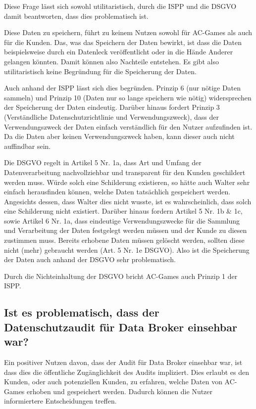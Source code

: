 Diese Frage lässt sich sowohl utilitaristisch, durch die ISPP und die DSGVO damit beantworten, dass dies problematisch ist.

Diese Daten zu speichern, führt zu keinem Nutzen sowohl für AC-Games als auch für die Kunden.
Das, was das Speichern der Daten bewirkt, ist dass die Daten beispielsweise durch ein Datenleck veröffentlicht oder in die Hände Anderer gelangen könnten.
Damit können also Nachteile entstehen.
Es gibt also utilitaristisch keine Begründung für die Speicherung der Daten.

Auch anhand der ISPP lässt sich dies begründen. Prinzip 6 (nur nötige Daten sammeln) und Prinzip 10 (Daten nur so lange speichern wie nötig) widersprechen der Speicherung der Daten eindeutig.
Darüber hinaus fordert Prinzip 3 (Verständliche Datenschutzrichtlinie und Verwendungszweck), dass der Verwendungszweck der Daten einfach verständlich für den Nutzer aufzufinden ist.
Da die Daten aber keinen Verwendungszweck haben, kann dieser auch nicht auffindbar sein.  

Die DSGVO regelt in Artikel 5 Nr. 1a, dass Art und Umfang der Datenverarbeitung nachvollziehbar und transparent für den Kunden geschildert werden muss.
Würde solch eine Schilderung existieren, so hätte auch Walter sehr einfach herausfinden können, welche Daten tatsächlich gespeichert werden.
Angesichts dessen, dass Walter dies nicht wusste, ist es wahrscheinlich, dass solch eine Schilderung nicht existiert.
Darüber hinaus fordern Artikel 5 Nr. 1b \& 1c, sowie Artikel 6 Nr. 1a, dass eindeutige Verwendungszwecke für die Sammlung und Verarbeitung der Daten festgelegt werden müssen und der Kunde zu diesen zustimmen muss.
Bereits erhobene Daten müssen gelöscht werden, sollten diese nicht (mehr) gebraucht werden (Art. 5 Nr. 1e DSGVO).
Also ist die Speicherung der Daten auch anhand der DSGVO sehr problematisch.

Durch die Nichteinhaltung der DSGVO bricht AC-Games auch Prinzip 1 der ISPP.

\subsection{Ist es problematisch, dass der Datenschutzaudit für Data Broker einsehbar war? \cite{kees_faites_2017}}

Ein positiver Nutzen davon, dass der Audit für Data Broker einsehbar war, ist dass dies die öffentliche Zugänglichkeit des Audits impliziert.
Dies erlaubt es den Kunden, oder auch potenziellen Kunden, zu erfahren, welche Daten von AC-Games erhoben und gespeichert werden. Dadurch können die Nutzer informiertere Entscheidungen treffen.

